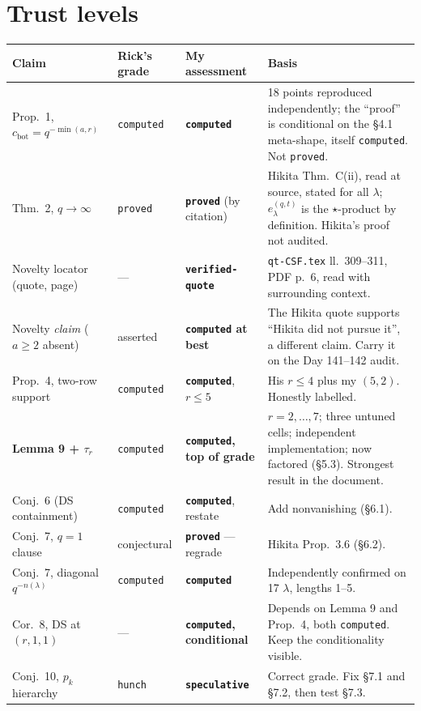 \documentclass[11pt]{article}
\newcommand{\gr}[1]{\texttt{#1}}
\begin{document}
\section{Trust levels}
\begin{center}
\small
\begin{longtable}{@{}p{4.4cm}p{1.9cm}p{2.3cm}p{5.4cm}@{}}
\toprule
Claim & Rick's grade & My assessment & Basis \\
\midrule \endhead
Prop.\ 1, $c_{\mathrm{bot}}=q^{-\min(a,r)}$ & \gr{computed} & \textbf{\gr{computed}} & 18 points reproduced independently; the ``proof'' is conditional on the \S4.1 meta-shape, itself \gr{computed}. Not \gr{proved}. \\
Thm.\ 2, $q\to\infty$ & \gr{proved} & \textbf{\gr{proved}} (by citation) & Hikita Thm.\ C(ii), read at source, stated for all $\lambda$; $e^{(q,t)}_\lambda$ is the $\star$-product by definition. Hikita's proof not audited. \\
Novelty locator (quote, page) & --- & \textbf{\gr{verified-quote}} & \texttt{qt-CSF.tex} ll.~309--311, PDF p.~6, read with surrounding context. \\
Novelty \emph{claim} ($a\ge2$ absent) & asserted & \textbf{\gr{computed} at best} & The Hikita quote supports ``Hikita did not pursue it'', a different claim. Carry it on the Day 141--142 audit. \\
Prop.\ 4, two-row support & \gr{computed} & \textbf{\gr{computed}}, $r\le5$ & His $r\le4$ plus my $(5,2)$. Honestly labelled. \\
\textbf{Lemma 9 + $\tau_r$} & \gr{computed} & \textbf{\gr{computed}, top of grade} & $r=2,\dots,7$; three untuned cells; independent implementation; now factored (\S5.3). Strongest result in the document. \\
Conj.\ 6 (DS containment) & \gr{computed} & \textbf{\gr{computed}}, restate & Add nonvanishing (\S6.1). \\
Conj.\ 7, $q=1$ clause & conjectural & \textbf{\gr{proved}} --- regrade & Hikita Prop.\ 3.6 (\S6.2). \\
Conj.\ 7, diagonal $q^{-n(\lambda)}$ & \gr{computed} & \textbf{\gr{computed}} & Independently confirmed on 17 $\lambda$, lengths 1--5. \\
Cor.\ 8, DS at $(r,1,1)$ & --- & \textbf{\gr{computed}, conditional} & Depends on Lemma 9 and Prop.\ 4, both \gr{computed}. Keep the conditionality visible. \\
Conj.\ 10, $p_k$ hierarchy & \gr{hunch} & \textbf{\gr{speculative}} & Correct grade. Fix \S7.1 and \S7.2, then test \S7.3. \\
\bottomrule
\end{longtable}
\end{center}
\end{document}
